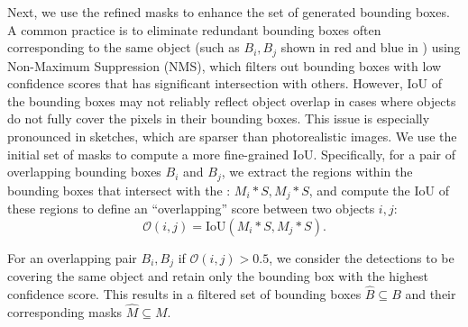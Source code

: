 Next, we use the refined masks to enhance the set of generated bounding boxes. A common practice is to eliminate redundant bounding boxes often corresponding to the same object (such as $B_i, B_j$ shown in red and blue in ) using Non-Maximum Suppression (NMS), which filters out bounding boxes with low confidence scores that has significant intersection with others. However, IoU of the bounding boxes may not reliably reflect object overlap in cases where objects do not fully cover the pixels in their bounding boxes. This issue is especially pronounced in sketches, which are sparser than photorealistic images.
We use the initial set of masks to compute a more fine-grained IoU. Specifically, for a pair of overlapping bounding boxes $B_i$ and $B_j$, we extract the regions within the bounding boxes that intersect with the : $M_i * S, M_j * S$, and compute the IoU of these regions to define an ``overlapping'' score between two objects $i, j$:
\vspace{-1pt} 
\begin{equation} 
\mathcal{O}(i, j) = \text{IoU}(M_i * S, M_j * S).
\end{equation}



\vspace{-1pt} 
For an overlapping pair $B_i, B_j$ if $\mathcal{O}(i, j) > 0.5$, we consider the detections to be covering the same object and retain only the bounding box with the highest confidence score.
This results in a filtered set of bounding boxes $\hat{B}\subseteq B$ and their corresponding masks $\hat{M} \subseteq M$.



